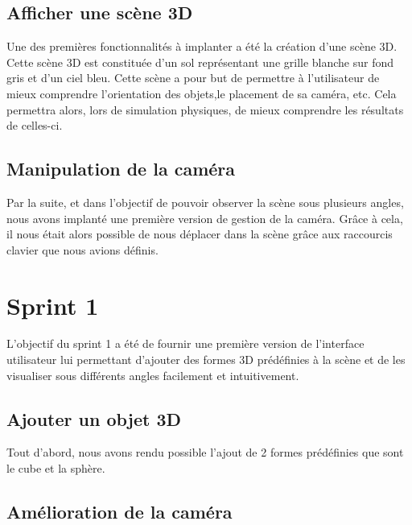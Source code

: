 \documentclass[11pt]{report}
\begin{document}
\subsection{Afficher une scène 3D}

Une des premières fonctionnalités à implanter a été la création d'une scène 3D. 
Cette scène 3D est constituée d'un sol représentant une grille blanche sur fond gris et d'un ciel bleu.
Cette scène a pour but de permettre à l'utilisateur de mieux comprendre l'orientation des objets,le placement
de sa caméra, etc. Cela permettra alors, lors de simulation physiques, de mieux comprendre les résultats de celles-ci.


\subsection{Manipulation de la caméra}

Par la suite, et dans l'objectif de pouvoir observer la scène sous plusieurs angles, nous avons implanté une première
version de gestion de la caméra. Grâce à cela, il nous était alors possible de nous déplacer dans la scène grâce
aux raccourcis clavier que nous avions définis.


\section{Sprint 1}

L'objectif du sprint 1 a été de fournir une première version de l'interface utilisateur lui permettant
d'ajouter des formes 3D prédéfinies à la scène et de les visualiser sous différents angles facilement et intuitivement.

\subsection{Ajouter un objet 3D}

Tout d'abord, nous avons rendu possible l'ajout de 2 formes prédéfinies que sont le cube et la sphère.


\subsection{Amélioration de la caméra}
\end{document}
